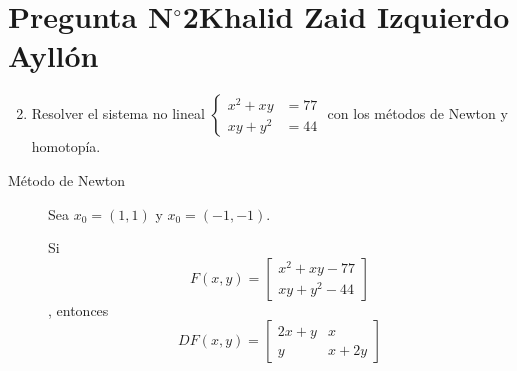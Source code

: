 \section{Pregunta N$^{\circ}$2\qquad Khalid Zaid Izquierdo Ayllón}

\begin{frame}

\end{frame}

\begin{frame}
	\begin{enumerate}\setcounter{enumi}{1}
		\item

		      Resolver el sistema no lineal
		      \begin{math}
			      \left\{
			      \begin{aligned}
				      x^{2} + xy  & = 77 \\
				      xy  + y^{2} & = 44
			      \end{aligned}
			      \right.
		      \end{math}
		      con los métodos de Newton y
		      homotopía.
	\end{enumerate}

	\begin{solution}
		\begin{description}
			\item[Método de Newton]

				Sea $x_{0}=\left(1,1\right)$ y $x_{0}=\left(-1,-1\right)$.

				Si
				\begin{equation*}
					F\left(x,y\right)=
					\begin{bmatrix}
						x^{2} + xy -77 \\
						xy  + y^{2} - 44
					\end{bmatrix}
				\end{equation*},
				entonces
				\begin{equation*}
					DF\left(x,y\right)=
					\begin{bmatrix}
						2x+y & x    \\
						y    & x+2y
					\end{bmatrix}
				\end{equation*}
		\end{description}
	\end{solution}
\end{frame}

